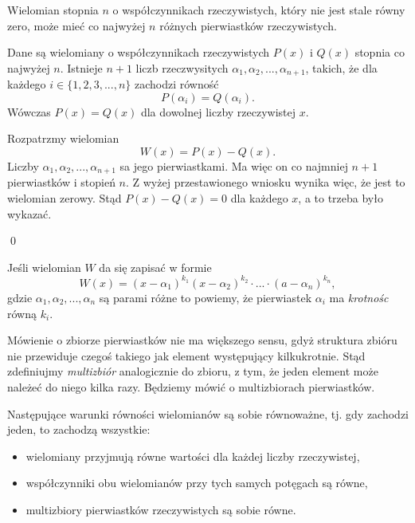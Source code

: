 \vspace{5px}


\noindent
Wielomian stopnia $n$ o współczynnikach rzeczywistych, który nie jest stale równy zero, może mieć co najwyżej $n$ różnych pierwiastków rzeczywistych.


\vspace{5px} 



\noindent
Dane są wielomiany o współczynnikach rzeczywistych $P(x)$ i $Q(x)$ stopnia co najwyżej $n$. Istnieje $n + 1$ liczb rzeczwysitych $\alpha_1, \alpha_2, ..., \alpha_{n + 1}$, takich, że dla każdego $i \in \{1, 2, 3, ..., n\}$ zachodzi równość 
\[
    P(\alpha_i) = Q(\alpha_i).
\]
Wówczas $P(x) = Q(x)$ dla dowolnej liczby rzeczywistej $x$.

\vspace{5px}


\noindent
Rozpatrzmy wielomian 
\[
    W(x) = P(x) - Q(x).
\]
Liczby $\alpha_1, \alpha_2, ..., \alpha_{n + 1}$ sa jego pierwiastkami. Ma więc on co najmniej $n + 1$ pierwiastków i stopień $n$. Z wyżej przestawionego wniosku wynika więc, że jest to wielomian zerowy. Stąd $P(x) - Q(x) = 0$ dla każdego $x$, a to trzeba było wykazać.

\qed


\noindent
Jeśli wielomian $W$ da się zapisać w formie
\[
    W(x) = (x - \alpha_1)^{k_1}(x - \alpha_2)^{k_2} \cdot ... \cdot (a - \alpha_n)^{k_n},
\]
gdzie $\alpha_1, \alpha_2, ..., \alpha_{n}$ są parami różne to powiemy, że pierwiastek $\alpha_i$ ma \textit{krotnośc} równą $k_i$. 

Mówienie o zbiorze pierwiastków nie ma większego sensu, gdyż struktura zbióru nie przewiduje czegoś takiego jak element występujący kilkukrotnie. Stąd zdefiniujmy \textit{multizbiór} analogicznie do zbioru, z tym, że jeden element może należeć do niego kilka razy. Będziemy mówić o multizbiorach pierwiastków.

\vspace{5px}


\noindent
Następujące warunki równości wielomianów są sobie równoważne, tj. gdy zachodzi jeden, to zachodzą wszystkie:
\begin{itemize}
    \item wielomiany przyjmują równe wartości dla każdej liczby rzeczywistej,
    \item współczynniki obu wielomianów przy tych samych potęgach są równe,
    \item multizbiory pierwiastków rzeczywistych są sobie równe.
\end{itemize}

